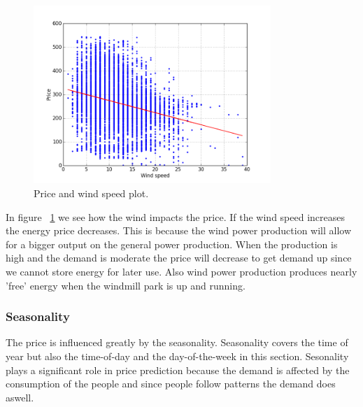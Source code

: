 \begin{figure}[H]
\centering
\includegraphics[width=0.8\textwidth ,natwidth=410,natheight=237]{billeder/energy_price_plots/price_wind.png}
\caption{Price and wind speed plot.}
\label{fig:price_wind}
\end{figure}

In figure ~\ref{fig:price_wind} we see how the wind impacts the price. If the wind speed increases the energy price decreases. This is because the wind power production will allow for a bigger output on the general power production. When the production is high and the demand is moderate the price will decrease to get demand up since we cannot store energy for later use. Also wind power production produces nearly 'free' energy when the windmill park is up and running.

\subsubsection{Seasonality}
The price is influenced greatly by the seasonality. Seasonality covers the time of year but also the time-of-day and the day-of-the-week in this section. Sesonality plays a significant role in price prediction because the demand is affected by the consumption of the people and since people follow patterns the demand does aswell.

